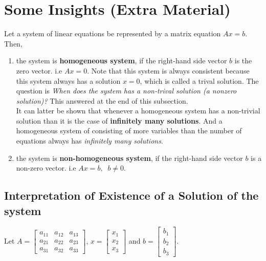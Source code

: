 \documentclass[math101_lecturenotes_ku.tex]{subfiles}
\begin{document}
\section{Some Insights (Extra Material)}
Let a system of linear equations be represented by a matrix equation \(Ax=b\). Then,
\begin{enumerate}
\item the system is \textbf{homogeneous system}, if the right-hand side vector \(b\) is the zero vector. i.e \(Ax=0\). Note that this system is always consistent because this system always has a solution \(x=0\), which is called a trival solution. The question is \textit{When does the system has a non-trival solution (a nonzero solution)?} This answered at the end of this subsection. \\
  It can latter be shown that whenever a homogeneous system has a non-trivial solution than it is the case of \textbf{infinitely many solutions}. And a homogeneous system of consisting of more variables than the number of equations always has \textit{infinitely many solutions}.

 \item the system is \textbf{non-homogeneous system}, if the right-hand side vector \(b\) is a non-zero vector. i.e \(Ax=b, \;\; b \neq 0\).
 \end{enumerate}

 \subsection{Interpretation of Existence of a Solution of the system}
Let \(A= \displaystyle \begin{bmatrix}
    a_{11} & a_{12} & a_{13} \\
    a_{21} &a_{22} &a_{23} \\
    a_{31} & a_{32} & a_{33}
  \end{bmatrix}\), \hspace{3mm} \(x= \begin{bmatrix} x_1 \\ x_2 \\x_3 \end{bmatrix}\) and  \hspace{3mm}\(b= \begin{bmatrix} b_1 \\ b_2 \\b_3 \end{bmatrix}\).
\end{document}
